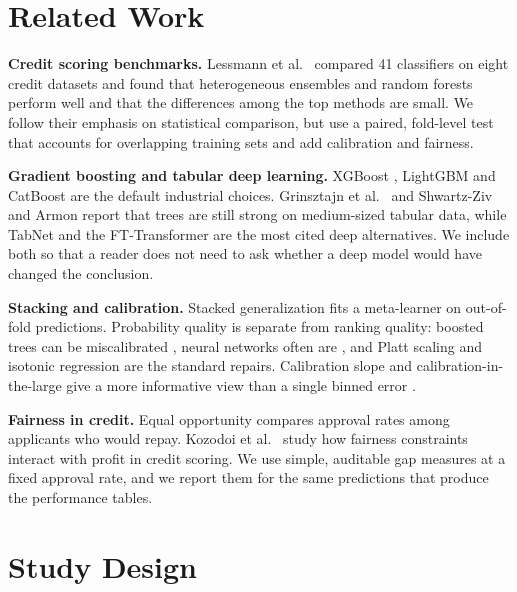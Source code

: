 \section{Related Work}
\textbf{Credit scoring benchmarks.} Lessmann et al.\ \cite{lessmann} compared 41 classifiers on eight credit datasets and found that heterogeneous ensembles and random forests perform well and that the differences among the top methods are small. We follow their emphasis on statistical comparison, but use a paired, fold-level test that accounts for overlapping training sets \cite{r25,demsar} and add calibration and fairness.

\textbf{Gradient boosting and tabular deep learning.} XGBoost \cite{r2}, LightGBM \cite{r23} and CatBoost \cite{r24} are the default industrial choices. Grinsztajn et al.\ \cite{r30} and Shwartz-Ziv and Armon \cite{szarmon} report that trees are still strong on medium-sized tabular data, while TabNet \cite{tabnet} and the FT-Transformer \cite{ftt} are the most cited deep alternatives. We include both so that a reader does not need to ask whether a deep model would have changed the conclusion.

\textbf{Stacking and calibration.} Stacked generalization \cite{r5} fits a meta-learner on out-of-fold predictions. Probability quality is separate from ranking quality: boosted trees can be miscalibrated \cite{r32}, neural networks often are \cite{r28}, and Platt scaling \cite{r26} and isotonic regression \cite{r27} are the standard repairs. Calibration slope and calibration-in-the-large give a more informative view than a single binned error \cite{vancalster,r29}.

\textbf{Fairness in credit.} Equal opportunity \cite{hardt} compares approval rates among applicants who would repay. Kozodoi et al.\ \cite{kozodoi} study how fairness constraints interact with profit in credit scoring. We use simple, auditable gap measures at a fixed approval rate, and we report them for the same predictions that produce the performance tables.

\section{Study Design}
